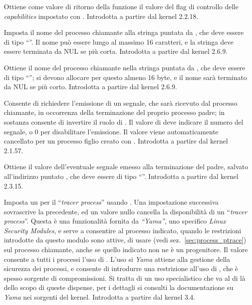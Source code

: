 \begin{basedescript}{\desclabelwidth{1.5cm}\desclabelstyle{\nextlinelabel}}
\item[\constd{PR\_GET\_KEEPCAPS}] Ottiene come valore di ritorno della funzione
  il valore del flag di controllo delle \textit{capabilities} impostato con
  . Introdotta a partire dal kernel 2.2.18.

\item[\constd{PR\_SET\_NAME}] Imposta il nome del processo chiamante alla
  stringa puntata da , che deve essere di tipo ``''. Il
  nome può essere lungo al massimo 16 caratteri, e la stringa deve essere
  terminata da NUL se più corta.  Introdotta a partire dal kernel 2.6.9.

\item[\constd{PR\_GET\_NAME}] Ottiene il nome del processo chiamante nella
  stringa puntata da , che deve essere di tipo ``'';
  si devono allocare per questo almeno 16 byte, e il nome sarà terminato da
  NUL se più corto. Introdotta a partire dal kernel 2.6.9.

\item[\constd{PR\_SET\_PDEATHSIG}] Consente di richiedere l'emissione di un
  segnale, che sarà ricevuto dal processo chiamante, in occorrenza della
  terminazione del proprio processo padre; in sostanza consente di invertire
  il ruolo di . Il valore di  deve indicare il
  numero del segnale, o 0 per disabilitare l'emissione. Il valore viene
  automaticamente cancellato per un processo figlio creato con .
  Introdotta a partire dal kernel 2.1.57.

\item[\constd{PR\_GET\_PDEATHSIG}] Ottiene il valore dell'eventuale segnale
  emesso alla terminazione del padre, salvato all'indirizzo
  puntato , che deve essere di tipo ``''. Introdotta a
  partire dal kernel 2.3.15.

\item[\constd{PR\_SET\_PTRACER}] Imposta un  per il ``\textit{tracer
    process}'' usando . Una impostazione successiva sovrascrive la
  precedente, ed un valore nullo cancella la disponibilità di un
  ``\textit{tracer process}''. Questa è una funzionalità fornita da
  \textit{``Yama''}, uno specifico \textit{Linux Security Modules}, e serve a
  consentire al processo indicato, quando le restrizioni introdotte da questo
  modulo sono attive, di usare  (vedi
  sez.~\ref{sec:process_ptrace}) sul processo chiamante, anche se quello
  indicato non ne è un progenitore. Il valore 
  consente a tutti i processi l'uso di . L'uso si \textit{Yama}
  attiene alla gestione della sicurezza dei processi, e consente di introdurre
  una restrizione all'uso di , che è spesso sorgente di
  compromissioni. Si tratta di un uso specialistico che va al di là dello
  scopo di queste dispense, per i dettagli si consulti la documentazione su
  \textit{Yama} nei sorgenti del kernel. Introdotta a partire dal kernel 3.4.


\end{basedescript}
